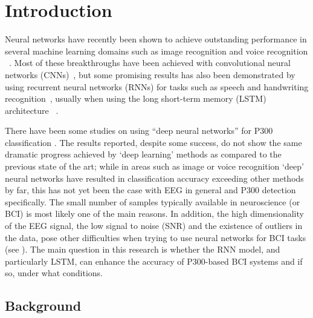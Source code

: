 \documentclass[
12pt, %
english, %
doublespacing, %
headsepline, %
]{MastersDoctoralThesis} %
\begin{document}
\pagestyle{thesis} %


\chapter{Introduction}

\vspace{0.4cm}

Neural networks have recently been shown to achieve outstanding performance in several machine learning domains such as image recognition \cite{krizhevsky2012imagenet} and voice recognition ~\cite{hinton2012deep}. Most of these breakthroughs have been achieved with convolutional neural networks (CNNs)~\cite{Lenet98}, but some promising results has also been demonstrated by using recurrent neural networks (RNNs) for tasks such as speech and handwriting recognition~\cite{graves2013speech, graves2008unconstrained}, usually when using the long short-term memory (LSTM) architecture ~\cite{LSTM_origin}.

There have been some studies on using ``deep neural networks'' for P300 classification \cite{P300_CNN, RSVP_P300_geva}. The results reported, despite some success, do not show the same dramatic progress achieved by `deep learning' methods as compared to the previous state of the art; while in areas such as image or voice recognition `deep' neural networks have resulted in classification accuracy exceeding other methods by far, this has not yet been the case with EEG in general and P300 detection specifically. The small number of samples typically available in neuroscience (or BCI) is most likely one of the main reasons. In addition, the high dimensionality of the EEG signal, the low signal to noise (SNR) and the existence of outliers in the data, pose other difficulties when trying to use neural networks for BCI tasks (see \cite{lotte2007review}). The main question in this research is whether the RNN model, and particularly LSTM, can enhance the accuracy of P300-based BCI systems and if so, under what conditions.

\vspace{0.4cm}
\section{Background}
\vspace{0.4cm}
\end{document}
